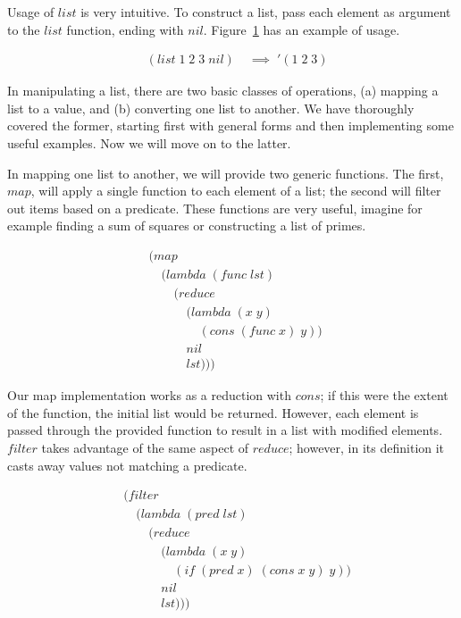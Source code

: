 Usage of $list$ is very intuitive. To construct a list, pass each element as
argument to the $list$ function, ending with $nil$.
Figure~\ref{fig:listExample} has an example of usage.   

\begin{figure}[htp]
\footnotesize
\caption{}\label{fig:listExample}
\begin{align*}
& (list \; 1 \; 2 \; 3 \; nil) \; &\implies \; '(1 \; 2 \; 3)
\end{align*}
\end{figure}

In manipulating a list, there are two basic classes of operations, (a) mapping a 
list to a value, and (b) converting one list to another. We have thoroughly 
covered the former, starting first with general forms and then implementing some 
useful examples. Now we will move on to the latter.

In mapping one list to another, we will provide two generic functions. The first, 
$map$, will apply a single function to each element of a list; the second will 
filter out items based on a predicate. These functions are very useful, imagine 
for example finding a sum of squares or constructing a list of primes.

\begin{figure}[htp]
\footnotesize
\caption{}\label{fig:mapDef}
\begin{align*}
& (map \; 
\\& \quad (lambda \; (func \; lst)
\\& \qquad (reduce
\\& \qquad \quad (lambda \; (x \; y) \; 
\\& \qquad \qquad (cons \; (func \; x) \; y)) \; 
\\& \qquad \quad nil
\\& \qquad \quad lst)))
\end{align*}
\end{figure}

Our map implementation works as a reduction with $cons$; if this were the extent 
of the function, the initial list would be returned. However, each element is 
passed through the provided function to result in a list with modified elements. 
$filter$ takes advantage of the same aspect of $reduce$; however, in its 
definition it casts away values not matching a predicate.

\begin{figure}[htp]
\footnotesize
\caption{}\label{fig:filterDef}
\begin{align*}
& (filter \; 
\\& \quad (lambda \; (pred \; lst)
\\& \qquad (reduce
\\& \qquad \quad (lambda \; (x \; y)
\\& \qquad \qquad (if \; (pred \; x) \; (cons \; x \; y) \; y))
\\& \qquad \quad nil
\\& \qquad \quad lst)))
\end{align*}
\end{figure}

